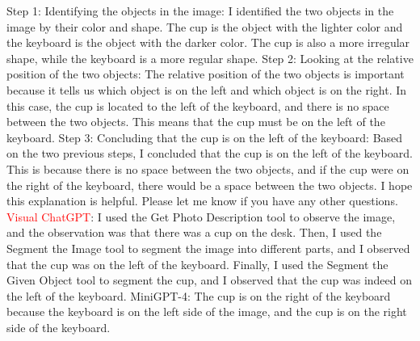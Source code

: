 \begin{enumerate}
        Step 1: Identifying the objects in the image: I identified the two objects in the image by their color and shape. The cup is the object with the lighter color and the keyboard is the object with the darker color. The cup is also a more irregular shape, while the keyboard is a more regular shape.
        Step 2: Looking at the relative position of the two objects: The relative position of the two objects is important because it tells us which object is on the left and which object is on the right. In this case, the cup is located to the left of the keyboard, and there is no space between the two objects. This means that the cup must be on the left of the keyboard.
        Step 3: Concluding that the cup is on the left of the keyboard: Based on the two previous steps, I concluded that the cup is on the left of the keyboard. This is because there is no space between the two objects, and if the cup were on the right of the keyboard, there would be a space between the two objects.
        I hope this explanation is helpful. Please let me know if you have any other questions.
        \subitem \textcolor{red}{Visual ChatGPT}: I used the Get Photo Description tool to observe the image, and the observation was that there was a cup on the desk. Then, I used the Segment the Image tool to segment the image into different parts, and I observed that the cup was on the left of the keyboard. Finally, I used the Segment the Given Object tool to segment the cup, and I observed that the cup was indeed on the left of the keyboard.
        \subitem MiniGPT-4: The cup is on the right of the keyboard because the keyboard is on the left side of the image, and the cup is on the right side of the keyboard.
    \end{enumerate}
